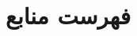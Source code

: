 \documentclass[a4paper,14pt,twoside,openright]{extbook}
\begin{document}
\frontmatter
\FrontMatterNumbering


\clearpage

\tableofcontents
\clearpage

\listoftables
\clearpage

\listoffigures
\clearpage

\mainmatter
\MainMatterNumbering



\ChapterStart
\chapter*{فهرست منابع}
\begin{latin}
  \small
  \begin{sloppypar}
    \printbibliography[heading=none]
  \end{sloppypar}
\end{latin}
\end{document}
